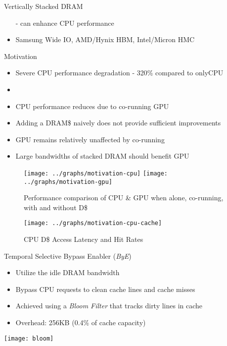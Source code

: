 \documentclass[final,t]{beamer}
\begin{document}
\begin{frame}[t,fragile]{}
\begin{columns}[t]
\begin{column}{.47\linewidth}
\begin{exampleblock}{Vertically Stacked DRAM}
\begin{itemize}
    				\qquad - can enhance CPU performance
        	\item Samsung Wide IO, AMD/Hynix HBM, Intel/Micron HMC
        \end{itemize}
    \end{exampleblock}
    \begin{exampleblock}{Motivation}
        \begin{itemize}
        	\item Severe CPU performance degradation - 320\% compared to onlyCPU
       		\item 
       		\item CPU performance reduces due to co-running GPU
       		\item Adding a DRAM\$ naively does not provide sufficient improvements
       		\item GPU remains relatively unaffected by co-running

       		\item Large bandwidths of stacked DRAM should benefit GPU
        \end{itemize}
        
    \end{exampleblock}
    
    
    \begin{figure}
       \texttt{[image: ../graphs/motivation-cpu]}
       \texttt{[image: ../graphs/motivation-gpu]}
       \caption{Performance comparison of CPU \& GPU when alone, co-running, with and without D\$}
       \label{fig:motivation}
    \end{figure}
    \begin{figure}
       \texttt{[image: ../graphs/motivation-cpu-cache]}
       \caption{CPU D\$ Access Latency and Hit Rates}
       \label{fig:motivation-cpu-cache}
    \end{figure}
    \begin{exampleblock}{Temporal Selective Bypass Enabler (\textit{ByE})}
    \begin{itemize}
	    \item Utilize the idle DRAM bandwidth
	    \item Bypass CPU requests to clean cache lines and cache misses
	    \item Achieved using a \textit{Bloom Filter} that tracks dirty lines in cache
	    \item Overhead: 256KB (0.4\% of cache capacity)
    \end{itemize}
    \vspace{\baselineskip}\linebreak
    \centering
	\texttt{[image: bloom]}
	\end{exampleblock}
\end{column}



\end{columns}
\end{frame}
\end{document}

